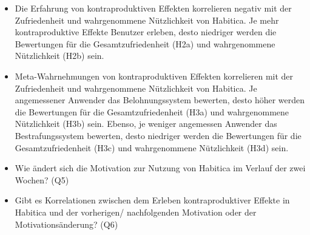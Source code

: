 \documentclass[sigconf, nonacm]{acmart}
\begin{document}


\begin{itemize}
    \item Die Erfahrung von kontraproduktiven Effekten korrelieren negativ mit der Zufriedenheit und wahrgenommene Nützlichkeit von Habitica. Je mehr kontraproduktive Effekte Benutzer erleben, desto niedriger werden die Bewertungen für die Gesamtzufriedenheit (H2a) und wahrgenommene Nützlichkeit (H2b) sein.
    \item Meta-Wahrnehmungen von kontraproduktiven Effekten korrelieren mit der Zufriedenheit und wahrgenommene Nützlichkeit von Habitica. Je angemessener Anwender das Belohnungssystem bewerten, desto höher werden die Bewertungen für die Gesamtzufriedenheit (H3a) und wahrgenommene Nützlichkeit (H3b) sein. Ebenso, je weniger angemessen Anwender das Bestrafungssystem bewerten, desto niedriger werden die Bewertungen für die Gesamtzufriedenheit (H3c) und wahrgenommene Nützlichkeit (H3d) sein.


    \item Wie ändert sich die Motivation zur Nutzung von Habitica im Verlauf der zwei Wochen? (Q5)
    \item Gibt es Korrelationen zwischen dem Erleben kontraproduktiver Effekte in Habitica und der vorherigen/ nachfolgenden Motivation oder der Motivationsänderung? (Q6)
\end{itemize}
\end{document}
